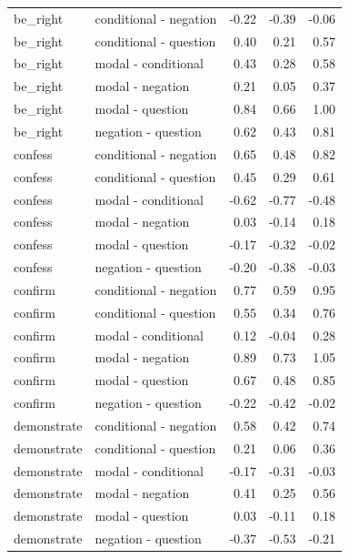 \documentclass[a4paper,12pt,twoside]{article}
\begin{document}
\begin{longtable}{llrrr}
      be\_right & conditional - negation & -0.22 & -0.39 & -0.06 \\ 
      be\_right & conditional - question & 0.40 & 0.21 & 0.57 \\ 
      be\_right & modal - conditional & 0.43 & 0.28 & 0.58 \\ 
      be\_right & modal - negation & 0.21 & 0.05 & 0.37 \\ 
      be\_right & modal - question & 0.84 & 0.66 & 1.00 \\ 
      be\_right & negation - question & 0.62 & 0.43 & 0.81 \\ \midrule
      
      confess & conditional - negation & 0.65 & 0.48 & 0.82 \\ 
      confess & conditional - question & 0.45 & 0.29 & 0.61 \\ 
      confess & modal - conditional & -0.62 & -0.77 & -0.48 \\ 
      confess & modal - negation & 0.03 & -0.14 & 0.18 \\ 
      confess & modal - question & -0.17 & -0.32 & -0.02 \\ 
      confess & negation - question & -0.20 & -0.38 & -0.03 \\ \midrule
      
      confirm & conditional - negation & 0.77 & 0.59 & 0.95 \\ 
      confirm & conditional - question & 0.55 & 0.34 & 0.76 \\ 
      confirm & modal - conditional & 0.12 & -0.04 & 0.28 \\ 
      confirm & modal - negation & 0.89 & 0.73 & 1.05 \\ 
      confirm & modal - question & 0.67 & 0.48 & 0.85 \\ 
      confirm & negation - question & -0.22 & -0.42 & -0.02 \\ \midrule

      demonstrate & conditional - negation & 0.58 & 0.42 & 0.74 \\ 
      demonstrate & conditional - question & 0.21 & 0.06 & 0.36 \\ 
      demonstrate & modal - conditional & -0.17 & -0.31 & -0.03 \\ 
      demonstrate & modal - negation & 0.41 & 0.25 & 0.56 \\ 
      demonstrate & modal - question & 0.03 & -0.11 & 0.18 \\ 
      demonstrate & negation - question & -0.37 & -0.53 & -0.21 \\ \midrule


\end{longtable}
\end{document}
